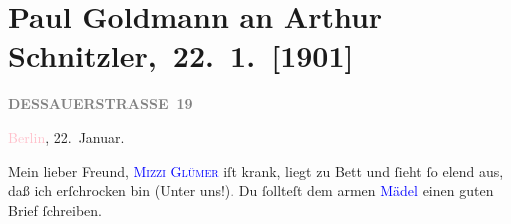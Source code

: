 

\renewcommand{\erwaehntePersonen}{Personen: Richard Beer-Hofmann, Otto Brahm, Marie Glümer, Alfred Kerr, Olga Schnitzler, Stefan Vacano}
\renewcommand{\erwaehnteInstitutionen}{Institutionen: Deutsches Theater Berlin}
\renewcommand{\erwaehnteOrte}{Orte: Berlin, Dessauer Straße, Wien}
\renewcommand{\erwaehnteWerke}{Werke: Der Tag, Michael Kramer. Drama, Neue Freie Presse, Zum großen Wurstel. Burleske in einem Akt, »Michael Kramer.«}
\section[ Paul Goldmann an Arthur Schnitzler, 22. 1. {[}1901{]}]{Paul Goldmann an Arthur Schnitzler, 22. 1. {[}1901{]}}
\nopagebreak{}
\rehead{ }\normalsize\beginnumbering{}
\toendnotes[C]{\smallbreak\pagebreak[2]}
\toendnotes[C]{\smallbreak}
\pstart
           \noindent{}\raggedleft{}{\pb}\textcolor{pink}{\textcolor{gray}{\textbf{DESSAUERSTRASSE 19}}}{}\ledrightnote{\textcolor{pink}{Dessauer Straße}}\pend
           
\pstart
           \textcolor{pink}{Berlin}{}\ledrightnote{\textcolor{pink}{Berlin}}, 22. Januar.\pend
           
\pstart\center{}Mein lieber Freund,\pend
\pstart
           \textsc{\textcolor{blue}{Mizzi Glümer}{}\ledrightnote{\textcolor{blue}{Marie Glümer}}} iſt krank, liegt zu Bett und ſieht ſo elend aus, daß ich erſchrocken bin (Unter
                  uns!)\textcolor{gray}{.} Du ſollteſt dem armen \textcolor{blue}{Mädel}{}\ledrightnote{{$\rightarrow$}\textcolor{blue}{Marie Glümer}} einen guten Brief ſchreiben.\pend
           
